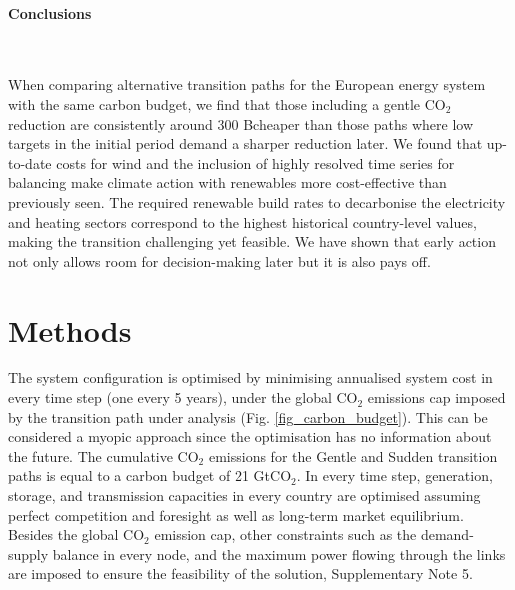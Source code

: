 \documentclass[5p]{elsarticle} %
\begin{document}
\paragraph{\textbf{Conclusions}} \

When comparing alternative transition paths for the European energy system with the same carbon budget, we find that those including a gentle CO$_2$ reduction are consistently around 300 B\EUR cheaper than those paths where low targets in the initial period demand a sharper reduction later.  We found that up-to-date costs for wind and the inclusion of highly resolved time series for balancing make climate action with renewables more cost-effective than previously seen. The required renewable build rates to decarbonise the electricity and heating sectors correspond to the highest historical country-level values, making the transition challenging yet feasible. We have shown that early action not only allows room for decision-making later but it is also pays off.  



\FloatBarrier
\section{Methods}

The system configuration is optimised by minimising annualised system cost in every time step (one every 5 years), under the global CO$_2$ emissions cap imposed by the transition path under analysis (Fig. \ref{fig_carbon_budget}). This can be considered a myopic approach since the optimisation has no information about the future. The cumulative CO$_2$ emissions for the Gentle and Sudden transition paths is equal to a carbon budget of 21 GtCO$_2$. In every time step, generation, storage, and transmission capacities in every country are optimised assuming perfect competition and foresight as well as long-term market equilibrium. Besides the global CO$_2$ emission cap, other constraints such as the demand-supply balance in every node, and the maximum power flowing through the links are imposed to ensure the feasibility of the solution, Supplementary Note 5. \
\end{document}
